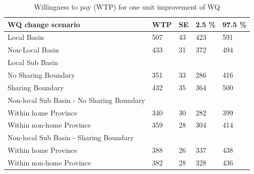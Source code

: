 \begin{table}[ht]
\caption{Willingness to pay (WTP) for one unit improvement of WQ } 
\centering
\begin{tabular}{p{7cm} p{1cm} p{0.8cm}p{0.9cm}p{1cm}}
  \hline
WQ change scenario & WTP & SE & 2.5 \% & 97.5 \% \\ 
  \hline
\hspace{0.8em}Local Basin & 507 & 43 & 423 & 591 \\ 
\hspace{0.8em}Non-Local Basin & 433 & 31 & 372 & 494 \\ 
\hline
Local Sub Basin  &  &  &  &  \\ 
\hline
\hspace{0.8em}No Sharing Boundary & 351 & 33 & 286 & 416 \\ 
\hspace{0.8em}Sharing Boundary & 432 & 35 & 364 & 500 \\ 
\hline
  Non-local Sub Basin - No Sharing Boundary &  &  &  &  \\
\hline
\hspace{0.8em}Within home Province  & 340 & 30 & 282 & 399 \\ 
\hspace{0.8em}Within non-home Province  & 359 & 28 & 304 & 414 \\ 
\hline
Non-local Sub Basin - Sharing Boundary &  &  &  &  \\ 
\hline
\hspace{0.8em}Within home Province  & 388 & 26 & 337 & 438 \\ 
\hspace{0.8em}Within non-home Province & 382 & 28 & 328 & 436 \\ 
   \hline
\end{tabular}
\end{table}
